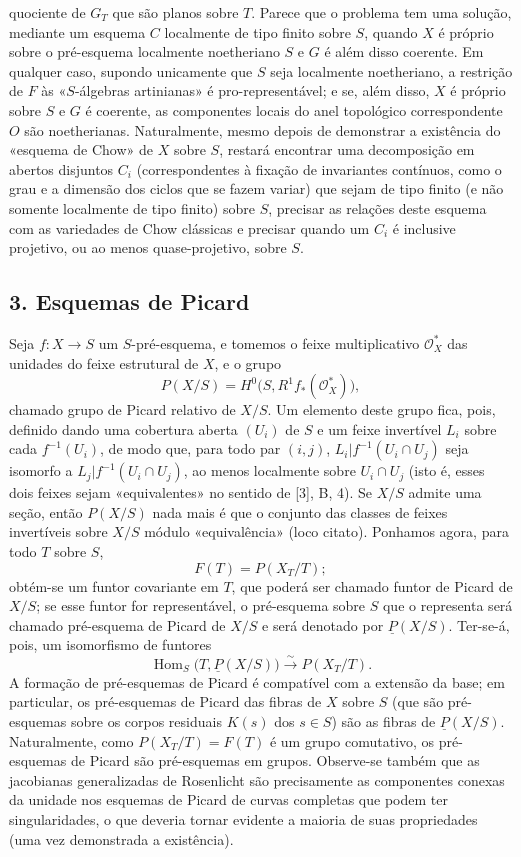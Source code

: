 quociente de $G_T$ que são planos sobre $T$. Parece que o problema tem uma
solução, mediante um esquema $C$ localmente de tipo finito sobre $S$, quando
$X$ é próprio sobre o pré-esquema localmente noetheriano $S$ e $G$ é além disso
coerente. Em qualquer caso, supondo unicamente que $S$ seja localmente
noetheriano, a restrição de $F$ às «$S$-álgebras artinianas» é
pro-representável; e se, além disso, $X$ é próprio sobre $S$ e $G$ é coerente, as
componentes locais do anel topológico correspondente $O$ são
noetherianas. Naturalmente, mesmo depois de demonstrar a existência do
«esquema de Chow» de $X$ sobre $S$, restará
encontrar uma decomposição em abertos disjuntos $C_i$ (correspondentes à
fixação de invariantes contínuos, como o grau e a dimensão dos
ciclos que se fazem variar) que sejam de tipo finito (e não somente localmente de
tipo finito) sobre $S$, precisar as relações deste esquema com as
variedades de Chow clássicas e precisar quando um $C_i$ é inclusive projetivo,
ou ao menos quase-projetivo, sobre $S$.

\subsection*{3. Esquemas de Picard}

Seja $f:X\longrightarrow S$ um $S$-pré-esquema, e tomemos o feixe
multiplicativo $\mathcal O_X^*$ das unidades do feixe estrutural de $X$, e
o grupo
\[
  P(X/S)=H^0\bigl(S,R^1f_*(\mathcal O_X^*)\bigr),
\]
chamado grupo de Picard relativo de $X/S$. Um elemento deste grupo fica,
pois, definido dando uma cobertura aberta $(U_i)$ de $S$ e um feixe invertível
$L_i$ sobre cada $f^{-1}(U_i)$, de modo que, para todo par $(i,j)$,
$L_i|f^{-1}(U_i\cap U_j)$ seja isomorfo a $L_j|f^{-1}(U_i\cap U_j)$, ao menos
localmente sobre $U_i\cap U_j$ (isto é, esses dois feixes sejam «equivalentes»
no sentido de [3], B, 4). Se $X/S$ admite uma seção, então $P(X/S)$ nada mais
é que o conjunto das classes de feixes invertíveis sobre $X/S$ módulo
«equivalência» (loco citato). Ponhamos agora, para todo $T$ sobre $S$,
\[
  F(T)=P(X_T/T) ;
\]
obtém-se um funtor covariante em $T$, que poderá ser chamado funtor de Picard de
$X/S$; se esse funtor for representável, o pré-esquema sobre $S$ que o
representa será chamado pré-esquema de Picard de $X/S$ e será denotado por
$\underline P(X/S)$. Ter-se-á, pois, um isomorfismo de funtores
\[
  \operatorname{Hom}_S\bigl(T,\underline P(X/S)\bigr)
  \xrightarrow{\sim}P(X_T/T).
\]
A formação de pré-esquemas de Picard é compatível com a extensão da
base; em particular, os pré-esquemas de Picard das fibras de $X$ sobre $S$
(que são pré-esquemas sobre os corpos residuais $K(s)$ dos $s\in S$) são
as fibras de $\underline P(X/S)$. Naturalmente, como $P(X_T/T)=F(T)$ é um
grupo comutativo, os pré-esquemas de Picard são pré-esquemas em grupos.
Observe-se também que as jacobianas generalizadas de Rosenlicht são precisamente
as componentes conexas da unidade nos esquemas de Picard de curvas
completas que podem ter singularidades, o que deveria tornar evidente a
maioria de suas propriedades (uma vez demonstrada a existência).

